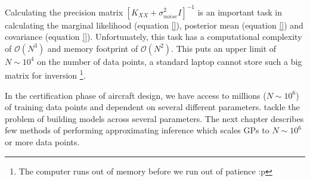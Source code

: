 Calculating the precision matrix $[K_{XX}+ \sigma_{noise}^{2}I]^{-1}$ is an important task in calculating the marginal likelihood (equation \ref{}), posterior mean (equation \ref{}) and covariance (equation \ref{}). Unfortunately, this task has a computational complexity of $\mathcal{O}\left ( N^{3} \right )$ and memory footprint of $\mathcal{O}\left ( N^{2} \right )$. This puts an upper limit of $N \sim 10^4$ on the number of data points, a standard laptop cannot store such a big matrix for inversion \footnote{The computer runs out of memory before we run out of patience :p}. 

In the certification phase of aircraft design, we have access to millions ($N \sim 10^6$) of training data points and dependent on several different parameters. \cite{bouhlel2016improved} tackle the problem of building models across several parameters. The next chapter describes few methods of performing approximating inference which scales GPs to $N \sim 10^6$ or more data points. 

